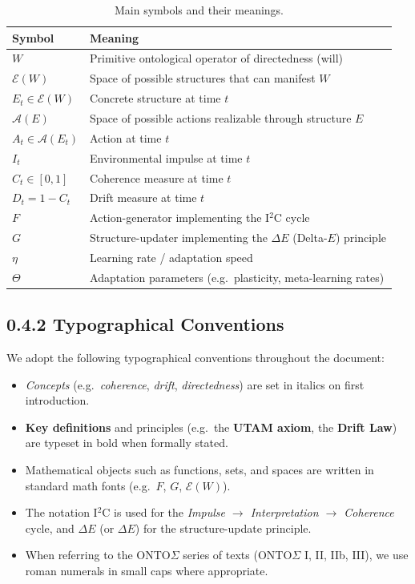 \documentclass[12pt,a4paper]{report}
\newcommand{\Will}{W}
\newcommand{\Struct}{E}
\begin{document}
\begin{table}[h!]
    \centering
    \begin{tabular}{ll}
        \toprule
        \textbf{Symbol} & \textbf{Meaning} \\
        \midrule
        $\Will$ & Primitive ontological operator of directedness (will) \\
        $\mathcal{E}(\Will)$ & Space of possible structures that can manifest $\Will$ \\
        $E_t \in \mathcal{E}(\Will)$ & Concrete structure at time $t$ \\
        $\mathcal{A}(E)$ & Space of possible actions realizable through structure $E$ \\
        $A_t \in \mathcal{A}(E_t)$ & Action at time $t$ \\
        $I_t$ & Environmental impulse at time $t$ \\
        $C_t \in [0,1]$ & Coherence measure at time $t$ \\
        $D_t = 1 - C_t$ & Drift measure at time $t$ \\
        $F$ & Action-generator implementing the I$^2$C cycle \\
        $G$ & Structure-updater implementing the $\Delta E$ (Delta-$E$) principle \\
        $\eta$ & Learning rate / adaptation speed \\
        $\Theta$ & Adaptation parameters (e.g.\ plasticity, meta-learning rates) \\
        \bottomrule
    \end{tabular}
    \caption{Main symbols and their meanings.}
    \label{tab:notation}
\end{table}

\subsection*{0.4.2 Typographical Conventions}

We adopt the following typographical conventions throughout the document:

\begin{itemize}[leftmargin=2em]
    \item \emph{Concepts} (e.g.\ \emph{coherence}, \emph{drift}, \emph{directedness}) are set in italics on first introduction.
    \item \textbf{Key definitions} and principles (e.g.\ the \textbf{UTAM axiom}, the \textbf{Drift Law}) are typeset in bold when formally stated.
    \item Mathematical objects such as functions, sets, and spaces are written in standard math fonts (e.g.\ $F$, $G$, $\mathcal{E}(\Will)$).
    \item The notation I$^2$C is used for the \emph{Impulse $\to$ Interpretation $\to$ Coherence} cycle, and $\Delta E$ (or $\Delta \Struct$) for the structure-update principle.
    \item When referring to the ONTO$\Sigma$ series of texts (ONTO$\Sigma$ I, II, IIb, III), we use roman numerals in small caps where appropriate.
\end{itemize}
\end{document}
